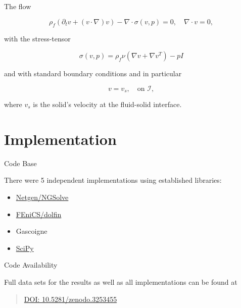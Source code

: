 \begin{frame}

\begin{block}{The flow}

\begin{equation*}
        \rho_f\left(\partial_t v + (v \cdot\nabla)v \right) - \nabla \cdot \sigma(v ,p) = 0, \quad \nabla\cdot v  = 0,
\end{equation*}

with the stress-tensor

\begin{equation*}
    \sigma (v,p) = \rho _ f\nu\left( \nabla v+\nabla v^T \right) - p I
\end{equation*}

and with standard boundary conditions and in particular

\begin{equation*}
    v = v_s, \quad \text{on } \mathcal I,
\end{equation*}

where \(v_s\) is the solid's velocity at the fluid-solid interface.

\end{block}

\end{frame}

\section{Implementation}\label{implementation}

\begin{frame}{Code Base}

There were 5 independent implementations using established libraries:

\begin{itemize}
\tightlist
\item
  \href{https://ngsolve.org/}{Netgen/NGSolve}
\item
  \href{https://fenicsproject.org/download/}{FEniCS/dolfin}
\item
  Gascoigne
\item
  \href{https://www.scipy.org}{SciPy}
\end{itemize}

\end{frame}

\begin{frame}{Code Availability}

Full data sets for the results as well as all implementations can be
found at

\begin{quote}
\href{https://doi.org/10.5281/zenodo.3253455}{DOI:
10.5281/zenodo.3253455}
\end{quote}

\end{frame}

